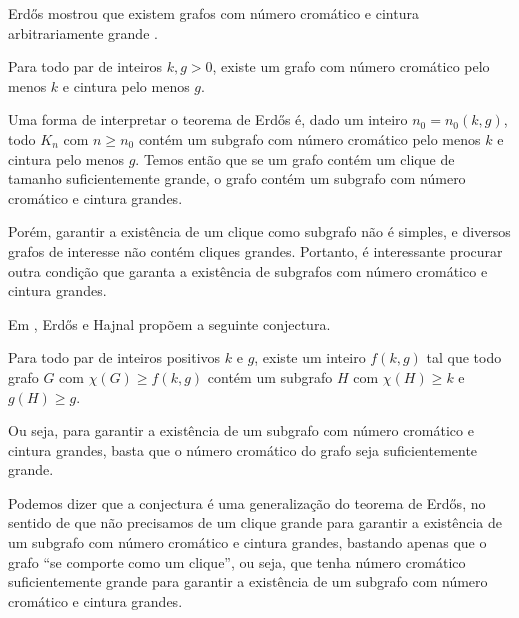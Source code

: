 
Erd\H{o}s mostrou que existem grafos com número cromático e cintura arbitrariamente grande \cite{erdos1959graph}.

\begin{teorema}\label{teoerdos}
Para todo par de inteiros $k,g > 0$, existe um grafo com número cromático pelo menos $k$ e cintura pelo menos $g$.
\end{teorema}

Uma forma de interpretar o teorema de Erd\H{o}s é, dado um inteiro $n_0 = n_0(k,g)$, todo $K_n$ com $n \geq n_0$ contém um subgrafo com número cromático pelo menos $k$ e cintura pelo menos $g$. Temos então que se um grafo contém um clique de tamanho suficientemente grande, o grafo contém um subgrafo com número cromático e cintura grandes.

Porém, garantir a existência de um clique como subgrafo não é simples, e diversos grafos de interesse não contém cliques grandes. Portanto, é interessante procurar outra condição que garanta a existência de subgrafos com número cromático e cintura grandes.

Em \cite{erdos1969conj}, Erd\H{o}s e Hajnal propõem a seguinte conjectura.

\begin{conjectura}
Para todo par de inteiros positivos $k$ e $g$, existe um inteiro $f(k,g)$ tal que todo grafo $G$ com $\chi(G) \geq f(k,g)$ contém um subgrafo $H$ com $\chi(H) \geq k$ e $g(H) \geq g$.
\end{conjectura}

Ou seja, para garantir a existência de um subgrafo com número cromático e cintura grandes, basta que o número cromático do grafo seja suficientemente grande.

Podemos dizer que a conjectura é uma generalização do teorema de Erd\H{o}s, no sentido de que não precisamos de um clique grande para garantir a existência de um subgrafo com número cromático e cintura grandes, bastando apenas que o grafo ``se comporte como um clique'', ou seja, que tenha número cromático suficientemente grande para garantir a existência de um subgrafo com número cromático e cintura grandes.

